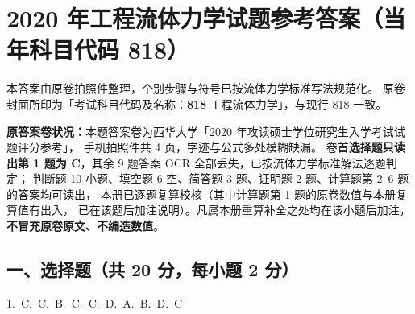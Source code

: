 \chapter{2020 年工程流体力学试题参考答案（当年科目代码 818）}

\begin{tishi}
本答案由原卷拍照件整理，个别步骤与符号已按流体力学标准写法规范化。
原卷封面所印为「考试科目代码及名称：\textbf{818} 工程流体力学」，与现行 818 一致。

\textbf{原答案卷状况：}本题答案卷为西华大学「2020 年攻读硕士学位研究生入学考试试题评分参考」，
手机拍照件共 4 页，字迹与公式多处模糊缺漏。
卷首\textbf{选择题只读出第 1 题为 C}，其余 9 题答案 OCR 全部丢失，已按流体力学标准解法逐题判定；
判断题 10 小题、填空题 6 空、简答题 3 题、证明题 2 题、计算题第 2--6 题的答案均可读出，
本册已逐题复算校核（其中计算题第 1 题的原卷数值与本册复算值有出入，
已在该题后加注说明）。凡属本册重算补全之处均在该小题后加注，\textbf{不冒充原卷原文、不编造数值}。
\end{tishi}

\section{一、选择题（共 20 分，每小题 2 分）}

\begin{center}
1.~C.~C.~B.~C.~C.~D.~A.~B.~D.~C
\end{center}

